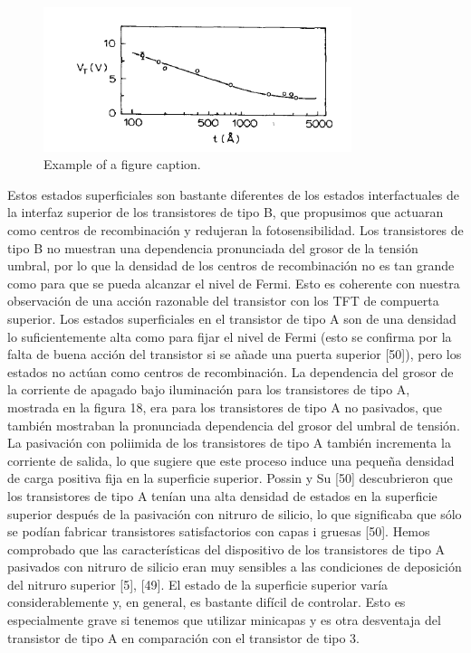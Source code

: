 \documentclass[conference]{IEEEtran}
\begin{document}
\begin{figure}[htbp]
    \centerline{\includegraphics[width=9.0cm]{img/imagen-21.png}}
    \caption{Example of a figure caption.}%
    \label{fig21}
\end{figure} 

    Estos estados superficiales son bastante diferentes de los estados interfactuales de la interfaz 
    superior de los transistores de tipo B, que propusimos que actuaran como centros de recombinación y 
    redujeran la fotosensibilidad. Los transistores de tipo B no muestran una dependencia pronunciada del 
    grosor de la tensión umbral, por lo que la densidad de los centros de recombinación no es tan grande 
    como para que se pueda alcanzar el nivel de Fermi. Esto es coherente con nuestra observación de una 
    acción razonable del transistor con los TFT de compuerta superior. Los estados superficiales en el 
    transistor de tipo A son de una densidad lo suficientemente alta como para fijar el nivel de Fermi 
    (esto se confirma por la falta de buena acción del transistor si se añade una puerta superior [50]), 
    pero los estados no actúan como centros de recombinación. La dependencia del grosor de la corriente 
    de apagado bajo iluminación para los transistores de tipo A, mostrada en la figura 18, era para los 
    transistores de tipo A no pasivados, que también mostraban la pronunciada dependencia del grosor del 
    umbral de tensión.
    \\
    La pasivación con poliimida de los transistores de tipo A también incrementa la corriente de salida, 
    lo que sugiere que este proceso induce una pequeña densidad de carga positiva fija en la superficie 
    superior. Possin y Su [50] descubrieron que los transistores de tipo A tenían una alta densidad de 
    estados en la superficie superior después de la pasivación con nitruro de silicio, lo que significaba 
    que sólo se podían fabricar transistores satisfactorios con capas i gruesas [50]. Hemos comprobado 
    que las características del dispositivo de los transistores de tipo A pasivados con nitruro de silicio 
    eran muy sensibles a las condiciones de deposición del nitruro superior [5], [49]. El estado de la 
    superficie superior varía considerablemente y, en general, es bastante difícil de controlar. Esto es 
    especialmente grave si tenemos que utilizar minicapas y es otra desventaja del transistor de tipo A en 
    comparación con el transistor de tipo 3.
\end{document}
